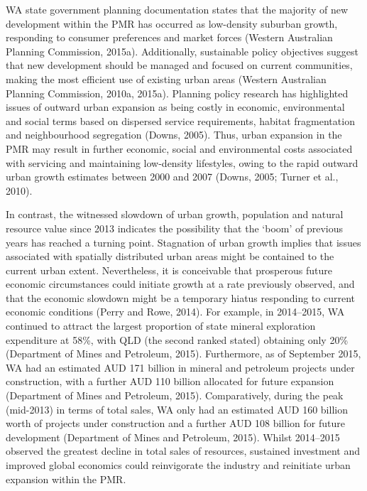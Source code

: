 \documentclass[]{book}
\begin{document}
WA state government planning documentation states that the majority of
new development within the PMR has occurred as low-density suburban
growth, responding to consumer preferences and market forces (Western
Australian Planning Commission, 2015a). Additionally, sustainable policy
objectives suggest that new development should be managed and focused on
current communities, making the most efficient use of existing urban
areas (Western Australian Planning Commission, 2010a, 2015a). Planning
policy research has highlighted issues of outward urban expansion as
being costly in economic, environmental and social terms based on
dispersed service requirements, habitat fragmentation and neighbourhood
segregation (Downs, 2005). Thus, urban expansion in the PMR may result
in further economic, social and environmental costs associated with
servicing and maintaining low-density lifestyles, owing to the rapid
outward urban growth estimates between 2000 and 2007 (Downs, 2005;
Turner et al., 2010).

In contrast, the witnessed slowdown of urban growth, population and
natural resource value since 2013 indicates the possibility that the
`boom' of previous years has reached a turning point. Stagnation of
urban growth implies that issues associated with spatially distributed
urban areas might be contained to the current urban extent.
Nevertheless, it is conceivable that prosperous future economic
circumstances could initiate growth at a rate previously observed, and
that the economic slowdown might be a temporary hiatus responding to
current economic conditions (Perry and Rowe, 2014). For example, in
2014--2015, WA continued to attract the largest proportion of state
mineral exploration expenditure at 58\%, with QLD (the second ranked
stated) obtaining only 20\% (Department of Mines and Petroleum, 2015).
Furthermore, as of September 2015, WA had an estimated AUD 171 billion
in mineral and petroleum projects under construction, with a further AUD
110 billion allocated for future expansion (Department of Mines and
Petroleum, 2015). Comparatively, during the peak (mid-2013) in terms of
total sales, WA only had an estimated AUD 160 billion worth of projects
under construction and a further AUD 108 billion for future development
(Department of Mines and Petroleum, 2015). Whilst 2014--2015 observed
the greatest decline in total sales of resources, sustained investment
and improved global economics could reinvigorate the industry and
reinitiate urban expansion within the PMR.
\end{document}
